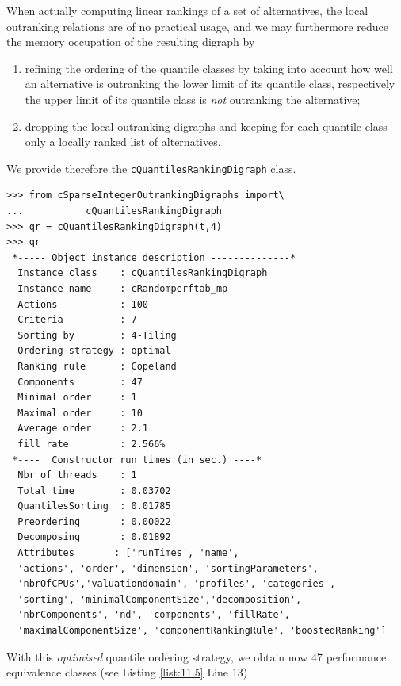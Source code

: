 When actually computing linear rankings of a set of alternatives, the local outranking relations are of no practical usage, and we may furthermore reduce the memory occupation of the resulting digraph by
\begin{enumerate}
\item refining the ordering of the quantile classes by taking into account how well an alternative is outranking the lower limit of its quantile class, respectively the upper limit of its quantile class is \emph{not} outranking the alternative;
\item dropping the local outranking digraphs and keeping for each quantile class only a locally ranked list of alternatives.
\end{enumerate}
We provide therefore the \texttt{cQuantilesRankingDigraph} class.

\begin{lstlisting}[caption={Ranking the sparse integer outranking digraph},label=list:11.5]
>>> from cSparseIntegerOutrankingDigraphs import\
...           cQuantilesRankingDigraph
>>> qr = cQuantilesRankingDigraph(t,4)
>>> qr
 *----- Object instance description --------------*
  Instance class    : cQuantilesRankingDigraph
  Instance name     : cRandomperftab_mp
  Actions           : 100
  Criteria          : 7
  Sorting by        : 4-Tiling
  Ordering strategy : optimal
  Ranking rule      : Copeland
  Components        : 47
  Minimal order     : 1
  Maximal order     : 10
  Average order     : 2.1
  fill rate         : 2.566%
 *----  Constructor run times (in sec.) ----*
  Nbr of threads    : 1
  Total time        : 0.03702
  QuantilesSorting  : 0.01785
  Preordering       : 0.00022
  Decomposing       : 0.01892
  Attributes       : ['runTimes', 'name',
  'actions', 'order', 'dimension', 'sortingParameters',
  'nbrOfCPUs','valuationdomain', 'profiles', 'categories',
  'sorting', 'minimalComponentSize','decomposition',
  'nbrComponents', 'nd', 'components', 'fillRate',
  'maximalComponentSize', 'componentRankingRule', 'boostedRanking']
\end{lstlisting}

With this \emph{optimised} quantile ordering strategy, we obtain now 47 performance equivalence classes (see Listing \ref{list:11.5} Line 13)

